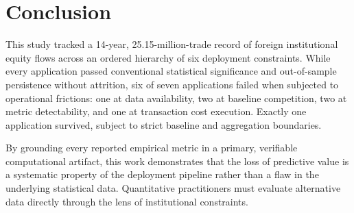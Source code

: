 \documentclass{ieeeaccess}
\begin{document}
\section{Conclusion}
\label{sec:conclusion}
This study tracked a 14-year, 25.15-million-trade record of foreign institutional equity flows across an ordered hierarchy of six deployment constraints. While every application passed conventional statistical significance and out-of-sample persistence without attrition, six of seven applications failed when subjected to operational frictions: one at data availability, two at baseline competition, two at metric detectability, and one at transaction cost execution. Exactly one application survived, subject to strict baseline and aggregation boundaries.

By grounding every reported empirical metric in a primary, verifiable computational artifact, this work demonstrates that the loss of predictive value is a systematic property of the deployment pipeline rather than a flaw in the underlying statistical data. Quantitative practitioners must evaluate alternative data directly through the lens of institutional constraints.

\end{document}
